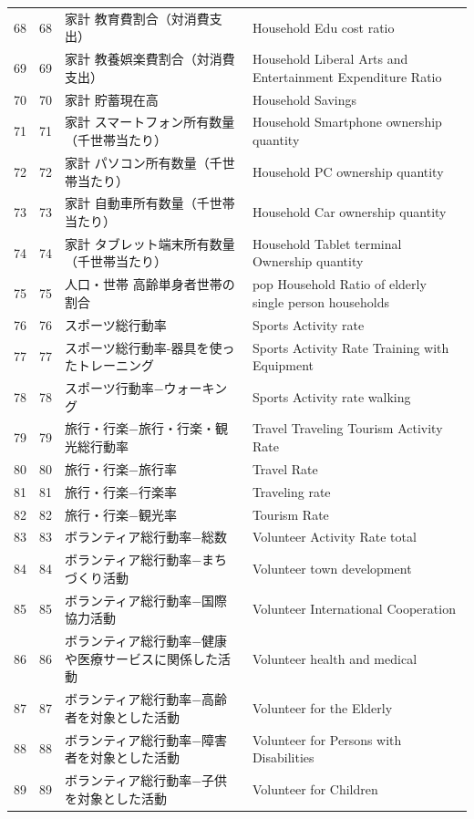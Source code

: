 \begin{table}[ht]
\begin{tabular}{rrll}
  68 &  68 & 家計 教育費割合（対消費支出） & Household Edu cost ratio \\ 
  69 &  69 & 家計 教養娯楽費割合（対消費支出） & Household Liberal Arts and Entertainment Expenditure Ratio \\ 
  70 &  70 & 家計 貯蓄現在高 & Household Savings \\ 
  71 &  71 & 家計 スマートフォン所有数量（千世帯当たり） & Household Smartphone ownership quantity \\ 
  72 &  72 & 家計 パソコン所有数量（千世帯当たり） & Household PC ownership quantity \\ 
  73 &  73 & 家計 自動車所有数量（千世帯当たり） & Household Car ownership quantity \\ 
  74 &  74 & 家計 タブレット端末所有数量（千世帯当たり） & Household Tablet terminal Ownership quantity \\ 
  75 &  75 & 人口・世帯 高齢単身者世帯の割合 & pop Household Ratio of elderly single person households \\ 
  76 &  76 & スポーツ総行動率 & Sports Activity rate \\ 
  77 &  77 & スポーツ総行動率-器具を使ったトレーニング & Sports Activity Rate Training with Equipment \\ 
  78 &  78 & スポーツ行動率−ウォーキング & Sports Activity rate walking \\ 
  79 &  79 & 旅行・行楽−旅行・行楽・観光総行動率 & Travel Traveling Tourism Activity Rate \\ 
  80 &  80 & 旅行・行楽−旅行率 & Travel Rate \\ 
  81 &  81 & 旅行・行楽−行楽率 & Traveling rate \\ 
  82 &  82 & 旅行・行楽−観光率 & Tourism Rate \\ 
  83 &  83 & ボランティア総行動率−総数 & Volunteer Activity Rate total \\ 
  84 &  84 & ボランティア総行動率−まちづくり活動 & Volunteer town development \\ 
  85 &  85 & ボランティア総行動率−国際協力活動 & Volunteer International Cooperation \\ 
  86 &  86 & ボランティア総行動率−健康や医療サービスに関係した活動 & Volunteer health and medical \\ 
  87 &  87 & ボランティア総行動率−高齢者を対象とした活動 & Volunteer for the Elderly \\ 
  88 &  88 & ボランティア総行動率−障害者を対象とした活動 & Volunteer for Persons with Disabilities \\ 
  89 &  89 & ボランティア総行動率−子供を対象とした活動 & Volunteer for Children \\ 

\end{tabular}
\end{table}
